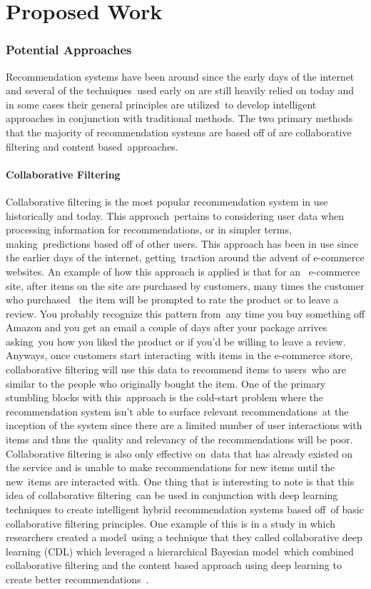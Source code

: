 \documentclass[letterpaper,12pt]{article}
\begin{document}
\chapter{Proposed Work}

\subsection{Potential Approaches}
Recommendation systems have been around since the early days of the internet and several of the techniques\
used early on are still heavily relied on today and in some cases their general principles are utilized\
to develop intelligent approaches in conjunction with traditional methods. The two primary methods that
the majority of recommendation systems are based off of are collaborative filtering and content based\
approaches. \cite{portugal2018use}

\subsubsection{Collaborative Filtering}
Collaborative filtering is the most popular recommendation system in use historically and today. This approach\
pertains to considering user data when processing information for recommendations, or in simpler terms, making\
predictions based off of other users. This approach has been in use since the earlier days of the internet, getting\
traction around the advent of e-commerce websites. An example of how this approach is applied is that for an \
e-commerce site, after items on the site are purchased by customers, many times the customer who purchased \
the item will be prompted to rate the product or to leave a review. You probably recognize this pattern from\
any time you buy something off Amazon and you get an email a couple of days after your package arrives asking\
you how you liked the product or if you'd be willing to leave a review. Anyways, once customers start interacting\
with items in the e-commerce store, collaborative filtering will use this data to recommend items to users\
who are similar to the people who originally bought the item. One of the primary stumbling blocks with this\
approach is the cold-start problem where the recommendation system isn't able to surface relevant recommendations\
at the inception of the system since there are a limited number of user interactions with items and thus the\
quality and relevancy of the recommendations will be poor. \cite{wang2017dynamic} Collaborative filtering is also only effective on\
data that has already existed on the service and is unable to make recommendations for new items until the new\
items are interacted with. One thing that is interesting to note is that this idea of collaborative filtering\
can be used in conjunction with deep learning techniques to create intelligent hybrid recommendation systems based off\
of basic collaborative filtering principles. One example of this is in a study in which researchers created a model\
using a technique that they called collaborative deep learning (CDL) which leveraged a hierarchical Bayesian model\
which combined collaborative filtering and the content based approach using deep learning to create better recommendations\
. \cite{Wang2015}
\end{document}
